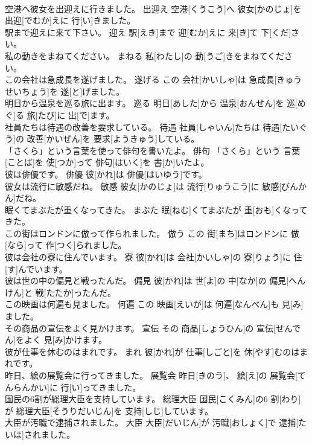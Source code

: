 \documentclass[8pt]{extreport}
\begin{document}
\begin{CJK}{UTF8}{min}
\\	空港へ彼女を出迎えに行きました。	出迎え	空港[くうこう]へ 彼女[かのじょ]を 出迎[でむか]えに 行[い]きました。	
\\	駅まで迎えに来て下さい。	迎え	駅[えき]まで 迎[むか]えに 来[き]て 下[くだ]さい。	
\\	私の動きをまねてください。	まねる	私[わたし]の 動[うご]きをまねてください。	
\\	この会社は急成長を遂げました。	遂げる	この 会社[かいしゃ]は 急成長[きゅうせいちょう]を 遂[と]げました。	
\\	明日から温泉を巡る旅に出ます。	巡る	明日[あした]から 温泉[おんせん]を 巡[めぐ]る 旅[たび]に 出[で]ます。	
\\	社員たちは待遇の改善を要求している。	待遇	社員[しゃいん]たちは 待遇[たいぐう]の 改善[かいぜん]を 要求[ようきゅう]している。	
\\	「さくら」という言葉を使って俳句を書いたよ。	俳句	「さくら」という 言葉[ことば]を 使[つか]って 俳句[はいく]を 書[か]いたよ。	
\\	彼は俳優です。	俳優	彼[かれ]は 俳優[はいゆう]です。	
\\	彼女は流行に敏感だね。	敏感	彼女[かのじょ]は 流行[りゅうこう]に 敏感[びんかん]だね。	
\\	眠くてまぶたが重くなってきた。	まぶた	眠[ねむ]くてまぶたが 重[おも]くなってきた。	
\\	この街はロンドンに倣って作られました。	倣う	この 街[まち]はロンドンに 倣[なら]って 作[つく]られました。	
\\	彼は会社の寮に住んでいます。	寮	彼[かれ]は 会社[かいしゃ]の 寮[りょう]に 住[す]んでいます。	
\\	彼は世の中の偏見と戦ったんだ。	偏見	彼[かれ]は 世[よ]の 中[なか]の 偏見[へんけん]と 戦[たたか]ったんだ。	
\\	この映画は何遍も見ました。	何遍	この 映画[えいが]は 何遍[なんべん]も 見[み]ました。	
\\	その商品の宣伝をよく見かけます。	宣伝	その 商品[しょうひん]の 宣伝[せんでん]をよく 見[み]かけます。	
\\	彼が仕事を休むのはまれです。	まれ	彼[かれ]が 仕事[しごと]を 休[やす]むのはまれです。	
\\	昨日、絵の展覧会に行ってきました。	展覧会	昨日[きのう]、 絵[え]の 展覧会[てんらんかい]に 行[い]ってきました。	
\\	国民の6割が総理大臣を支持しています。	総理大臣	国民[こくみん]の6 割[わり]が 総理大臣[そうりだいじん]を 支持[しじ]しています。	
\\	大臣が汚職で逮捕されました。	大臣	大臣[だいじん]が 汚職[おしょく]で 逮捕[たいほ]されました。	

\end{CJK}
\end{document}
